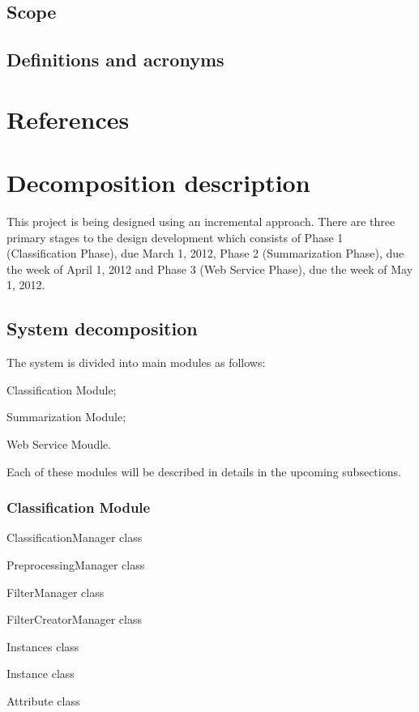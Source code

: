 \documentclass[12pt]{article}
\newenvironment{my_itemize}
{\begin{itemize}
  \setlength{\itemsep}{0cm}
  \setlength{\parskip}{0cm}}
{\end{itemize}}
\begin{document}
\subsection{Scope}
\subsection{Definitions and acronyms}

\section{References}

\section{Decomposition description}
This project is being designed using an incremental approach. There are three primary stages to the design development which consists of Phase 1 (Classification Phase), due March 1, 2012, Phase 2 (Summarization Phase), due the week of April 1, 2012 and Phase 3 (Web Service Phase), due the week of May 1, 2012.

\subsection{System decomposition}
The system is divided into main modules as follows:
\begin{my_itemize}
\item Classification Module;
\item Summarization Module;
\item Web Service Moudle.
\end{my_itemize}
Each of these modules will be described in details in the upcoming subsections.

\subsubsection{Classification Module}

\begin{my_itemize}
  \item ClassificationManager class
  \item PreprocessingManager class
  \item FilterManager class
  \item FilterCreatorManager class
  \item Instances class
  \item Instance class
  \item Attribute class
\end{my_itemize}
\end{document}
